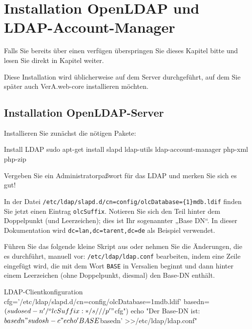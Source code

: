 \documentclass{tarentanleitung}
\begin{document}
\section{Installation OpenLDAP und LDAP-Account-Manager}\label{sec:setup-lam}

Falls Sie bereits über einen  verfügen
überspringen Sie dieses Kapitel bitte und lesen Sie direkt in
Kapitel  weiter.

Diese Installation wird üblicherweise auf dem Server durchgeführt,
auf dem Sie später auch VerA.web-core installieren möchten.

\subsection{Installation OpenLDAP-Server}\label{subsec:setup-lam-slapd}

\begin{minipage}{\linewidth}
Installieren Sie zunächst die nötigen Pakete:

\begin{lstdump}{Install LDAP}
sudo apt-get install slapd ldap-utils ldap-account-manager php-xml php-zip
\end{lstdump}

Vergeben Sie ein Administratorpaßwort für das LDAP und merken
Sie sich es gut!
\end{minipage}

In der Datei \texttt{/etc/ldap/slapd.d/cn=config/olcDatabase=\{1\}mdb.ldif}
finden Sie jetzt einen Eintrag \texttt{olcSuffix}. Notieren Sie sich den
Teil hinter dem Doppelpunkt (und Leerzeichen); dies ist Ihr sogenannter
„Base DN“. In dieser Dokumentation wird \texttt{dc=lan,dc=tarent,dc=de} als
Beispiel verwendet.

Führen Sie das folgende kleine Skript aus oder nehmen Sie die Änderungen,
die es durchführt, manuell vor: \texttt{/etc/ldap/ldap.conf} bearbeiten,
indem eine Zeile eingefügt wird, die mit dem Wort \texttt{BASE} in Versalien
beginnt und dann hinter einem Leerzeichen (ohne Doppelpunkt, diesmal) den
Base-DN enthält.\keinumbruch

\begin{minipage}{\linewidth}
\begin{lstdump}{LDAP-Clientkonfiguration}
cfg='/etc/ldap/slapd.d/cn=config/olcDatabase={1}mdb.ldif'
basedn=$(sudo sed -n '/^olcSuffix: */s///p' "$cfg")
echo "Der Base-DN ist: $basedn"
sudo sh -c "echo 'BASE $basedn' >>/etc/ldap/ldap.conf"
\end{lstdump}
\end{minipage}
\end{document}
